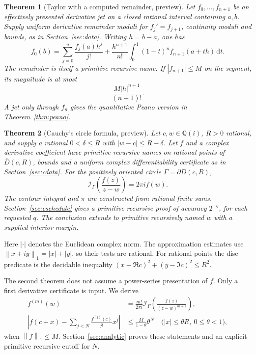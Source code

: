 \documentclass[11pt]{article}
\newtheorem{theorem}{Theorem}[section]
\theoremstyle{definition}
\newcommand{\Q}{\mathbb Q}
\newcommand{\abs}[1]{\left|#1\right|}
\newcommand{\norm}[1]{\left\lVert#1\right\rVert_1}
\newcommand{\dd}{\,\mathrm d}
\newcommand{\clD}{\overline D}
\newcommand{\Int}{\mathcal I}
\begin{document}
\begin{theorem}[Taylor with a computed remainder, preview]\label{thm:tpreview}
Let \(f_0,\ldots,f_{n+1}\) be an effectively presented derivative jet on a
closed rational interval containing \(a,b\). Supply uniform derivative
remainder moduli for \(f_j'=f_{j+1}\), continuity moduli and bounds, as in
Section~\ref{sec:data}. Writing \(h=b-a\), one has
\begin{equation}\label{eq:tmain}
 f_0(b)=\sum_{j=0}^{n}\frac{f_j(a)h^j}{j!}
  +\frac{h^{n+1}}{n!}\int_0^1(1-t)^n f_{n+1}(a+th)\dd t.
\end{equation}
The remainder is itself a primitive recursive name. If
\(\abs{f_{n+1}}\le M\) on the segment, its magnitude is at most
\begin{equation}\label{eq:tboundintro}
 \frac{M\abs h^{n+1}}{(n+1)!}.
\end{equation}
A jet only through \(f_n\) gives the quantitative Peano version in
Theorem~\ref{thm:peano}.
\end{theorem}

\begin{theorem}[Cauchy's circle formula, preview]\label{thm:cpreview}
Let \(c,w\in\Q(i)\), \(R>0\) rational, and supply a rational
\(0<\delta\le R\) with \(\abs{w-c}\le R-\delta\).
Let \(f\) and a complex derivative coefficient have primitive recursive
names on rational points of \(\clD(c,R)\), bounds and a uniform complex
differentiability certificate as in Section~\ref{sec:cdata}.
For the positively oriented circle \(\Gamma=\partial D(c,R)\),
\begin{equation}\label{eq:cmain}
 \Int_\Gamma\!\left(\frac{f(z)}{z-w}\right)=2\pi i f(w).
\end{equation}
The contour integral and \(\pi\) are constructed from rational finite
sums. Section~\ref{sec:cschedule} gives a primitive recursive proof of
accuracy \(2^{-q}\), for each requested \(q\). The conclusion extends to
primitive recursively named \(w\) with a supplied interior margin.
\end{theorem}

Here \(\abs{\cdot}\) denotes the Euclidean complex norm.
The approximation estimates use \(\norm{x+iy}=|x|+|y|\), so their
tests are rational. For rational points the disc predicate is the
decidable inequality
\((x-\Re c)^2+(y-\Im c)^2\le R^2\).

The second theorem does not assume a power-series presentation of \(f\).
Only a first derivative certificate is input. We derive
\begin{align}
 f^{(m)}(w)
  &=\frac{m!}{2\pi i}\Int_\Gamma
       \left(\frac{f(z)}{(z-w)^{m+1}}\right),\label{eq:derivintro}\\
 \abs{f(c+x)-\sum_{j<N}\frac{f^{(j)}(c)}{j!}x^j}
  &\le\frac{M}{1-\theta}\theta^N
       \quad\bigl(\abs x\le\theta R,\ 0\le\theta<1\bigr),\label{eq:ctailintro}
\end{align}
when \(\norm f\le M\). Section~\ref{sec:analytic} proves these statements
and an explicit primitive recursive cutoff for \(N\).
\end{document}
